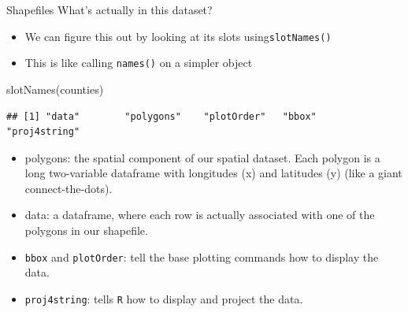 \documentclass[
  ignorenonframetext,
]{beamer}
\newenvironment{Shaded}{\begin{snugshade}}{\end{snugshade}}
\newcommand{\FunctionTok}[1]{\textcolor[rgb]{0.00,0.00,0.00}{#1}}
\newcommand{\NormalTok}[1]{#1}
\begin{document}
\begin{frame}[fragile]{Shapefiles}
\protect\hypertarget{shapefiles-1}{}
What's actually in this dataset?

\begin{itemize}
\item
  We can figure this out by looking at its slots
  using\texttt{slotNames()}
\item
  This is like calling \texttt{names()} on a simpler object
\end{itemize}

\tiny

\begin{Shaded}
\begin{Highlighting}[]
\FunctionTok{slotNames}\NormalTok{(counties)}
\end{Highlighting}
\end{Shaded}

\begin{verbatim}
## [1] "data"        "polygons"    "plotOrder"   "bbox"        "proj4string"
\end{verbatim}

\normalsize

\begin{itemize}
\item
  polygons: the spatial component of our spatial dataset. Each polygon
  is a long two-variable dataframe with longitudes (x) and latitudes (y)
  (like a giant connect-the-dots).
\item
  data: a dataframe, where each row is actually associated with one of
  the polygons in our shapefile.
\item
  \texttt{bbox} and \texttt{plotOrder}: tell the base plotting commands
  how to display the data.
\item
  \texttt{proj4string}: tells \texttt{R} how to display and project the
  data.
\end{itemize}
\end{frame}
\end{document}
